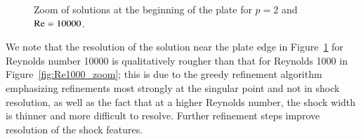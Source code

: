 \begin{figure}
\centering
{}
\caption{Zoom of solutions at the beginning of the plate for $p=2$ and $\Reyn = 10000$.}
\label{fig:Re1e4Zoom}
\end{figure}

We note that the resolution of the solution near the plate edge in Figure~\ref{fig:Re1e4Zoom} for Reynolds number 10000 is qualitatively rougher than that for Reynolds 1000 in Figure~\ref{fig:Re1000_zoom}; this is due to the greedy refinement algorithm emphasizing refinements most strongly at the singular point and not in shock resolution, as well as the fact that at a higher Reynolds number, the shock width is thinner and more difficult to resolve.  Further refinement steps improve resolution of the shock features.  

